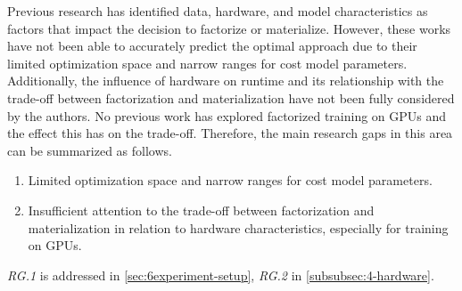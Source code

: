 Previous research has identified data, hardware, and model characteristics as factors that impact the decision to factorize or materialize. However, these works have not been able to accurately predict the optimal approach due to their limited optimization space and narrow ranges for cost model parameters. Additionally, the influence of hardware on runtime and its relationship with the trade-off between factorization and materialization have not been fully considered by the authors. No previous work has explored factorized training on GPUs and the effect this has on the trade-off. Therefore, the main research gaps in this area can be summarized as follows.
\begin{enumerate}[leftmargin=1.5cm, label=\emph{RG.\arabic*}]
  \item Limited optimization space and narrow ranges for cost model parameters.
  \item Insufficient attention to the trade-off between factorization and materialization in relation to hardware characteristics, especially for training on GPUs.
\end{enumerate}
\emph{RG.1} is addressed in \autoref{sec:6experiment-setup}, \emph{RG.2} in \autoref{subsubsec:4-hardware}.